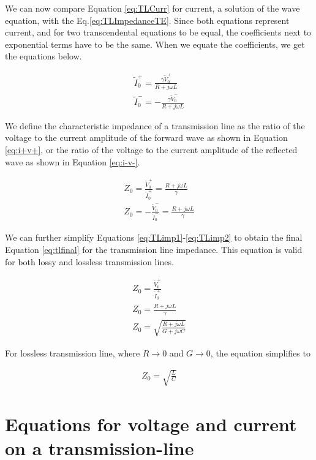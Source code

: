 \documentclass{ximera}
\begin{document}
We can now compare Equation \ref{eq:TLCurr} for current, a solution of the wave equation,  with the Eq.\ref{eq:TLImpedanceTE}. Since both equations represent current, and for two transcendental equations to be equal, the coefficients next to exponential terms have to be the same. When we equate the coefficients, we get the equations below.

\begin{eqnarray}
\tilde{I}_0^+=\frac{\gamma \tilde{V}_0^+}{R+ j \omega L} \label{eq:i+v+}  \\
\tilde{I}_0^-= - \frac{\gamma \tilde{V}_0^-}{R+ j \omega L} \label{eq:i-v-}
\end{eqnarray}


\begin{definition}
We define the characteristic impedance of a transmission line  as
the ratio of the voltage to the current amplitude of the forward
wave as shown in Equation \ref{eq:i+v+}, or the ratio of the voltage to the current amplitude of the reflected 
wave as shown in Equation \ref{eq:i-v-}.

\begin{eqnarray}
Z_0=\frac{\tilde{V}_0^+}{ \tilde{I}_0^+}=\frac{R+j\omega L}{\gamma} \label{eq:TLimp1}\\
Z_0=-\frac{\tilde{V}_0^-}{ \tilde{I}_0^-}=\frac{R+j\omega L}{\gamma}  \label{eq:TLimp2}
\end{eqnarray}


\end{definition}
We can further simplify Equations \ref{eq:TLimp1}-\ref{eq:TLimp2} to obtain the final Equation \ref{eq:tlfinal} for the transmission line impedance. This equation is valid for both lossy and lossless transmission lines.

\begin{eqnarray}
Z_0=\frac{\tilde{V}_0^+}{ \tilde{I}_0^+} \nonumber   \\ \nonumber
Z_0=\frac{R+j\omega L}{\gamma} \nonumber   \\ \nonumber
Z_0=\sqrt{\frac{R+j\omega L}{G+ j\omega C}} \label{eq:tlfinal}
\end{eqnarray}

For lossless transmission line, where $R \rightarrow 0$ and  $G \rightarrow 0$, the equation simplifies to 

\begin{eqnarray}
Z_0=\sqrt{\frac{L}{C}} 
\end{eqnarray}

\section{Equations for voltage and current on a transmission-line}
\end{document}
